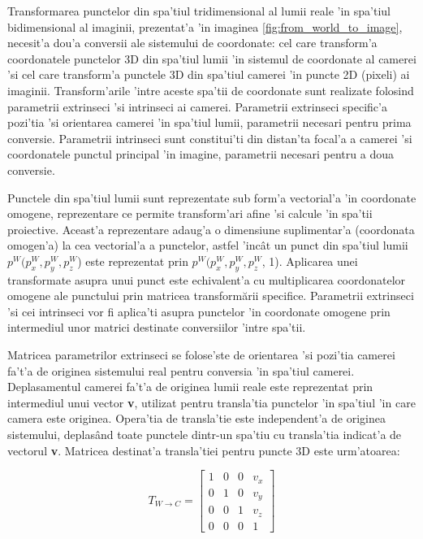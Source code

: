 \documentclass[12pt,a4paper,twoside]{report}
\begin{document}
Transformarea punctelor din spa'tiul tridimensional al lumii reale 'in spa'tiul bidimensional al imaginii, prezentat'a 'in imaginea \ref{fig:from_world_to_image}, necesit'a dou'a conversii ale sistemului de coordonate: cel care transform'a coordonatele punctelor 3D din spa'tiul lumii 'in sistemul de coordonate al camerei 'si cel care transform'a punctele 3D din spa'tiul camerei 'in puncte 2D (pixeli) ai imaginii. Transform'arile 'intre aceste spa'tii de coordonate sunt realizate folosind parametrii extrinseci 'si intrinseci ai camerei. Parametrii extrinseci specific'a pozi'tia 'si orientarea camerei 'in spa'tiul lumii, parametrii necesari pentru prima conversie. Parametrii intrinseci sunt constitui'ti din distan'ta focal'a a camerei 'si coordonatele punctul principal 'in imagine, parametrii necesari pentru a doua conversie.

Punctele din spa'tiul lumii sunt reprezentate sub form'a vectorial'a 'in coordonate omogene, reprezentare ce permite transform'ari afine 'si calcule 'in spa'tii proiective. Aceast'a reprezentare adaug'a o dimensiune suplimentar'a (coordonata omogen'a) la cea vectorial'a a punctelor, astfel 'inc\^at un punct din spa'tiul lumii $p^W(p_x^W, p_y^W, p_z^W$) este reprezentat prin $p^W(p_x^W, p_y^W, p_z^W$, 1). Aplicarea unei transformate asupra unui punct este echivalent'a cu multiplicarea coordonatelor omogene ale punctului prin matricea transformării specifice. Parametrii extrinseci 'si cei intrinseci vor fi aplica'ti asupra punctelor 'in coordonate omogene prin intermediul unor matrici destinate conversiilor 'intre spa'tii.

Matricea parametrilor extrinseci se folose'ste de orientarea 'si pozi'tia camerei fa't'a de originea sistemului real pentru conversia 'in spa'tiul camerei. Deplasamentul camerei fa't'a de originea lumii reale este reprezentat prin intermediul unui vector \textbf{v}, utilizat pentru transla'tia punctelor 'in spa'tiul 'in care camera este originea. Opera'tia de transla'tie este independent'a de originea sistemului, deplas\^and toate punctele dintr-un spa'tiu cu transla'tia  indicat'a de vectorul  \textbf{v}. Matricea destinat'a transla'tiei pentru puncte 3D este urm'atoarea:

\[
T_{W\rightarrow C} = 
	\begin{bmatrix}
	1 & 0 & 0 & v_x\\
	0 & 1 & 0 & v_y\\
	0 & 0 & 1 & v_z\\
	0 & 0 & 0 & 1
	\end{bmatrix}
\]
\end{document}
